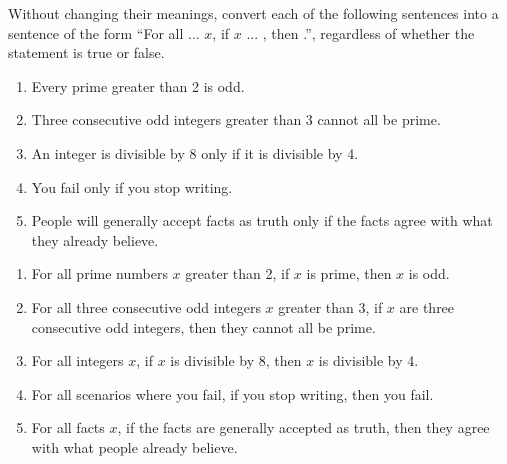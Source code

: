 \documentclass{article}
\theoremstyle{definition}
\begin{document}
\begin{question}
   Without changing their meanings, convert each of the following sentences into a sentence of the form ``For all ... $x$, if $x$ ... , then .'', regardless of whether the statement is true or false.
    \begin{enumerate}
        \item Every prime greater than 2 is odd.
        \item Three consecutive odd integers greater than 3 cannot all be prime.
        \item An integer is divisible by 8 only if it is divisible by 4.
        \item You fail only if you stop writing.
        \item People will generally accept facts as truth only if the facts agree with what they already believe.
    \end{enumerate}
\end{question}
\begin{solution}
    \begin{enumerate}
        \item For all prime numbers $x$ greater than 2, if $x$ is prime, then $x$ is odd.
        \item For all three consecutive odd integers $x$ greater than 3, if $x$ are three consecutive odd integers, then they cannot all be prime.
        \item For all integers $x$, if $x$ is divisible by 8, then $x$ is divisible by 4.
        \item For all scenarios where you fail, if you stop writing, then you fail.
        \item For all facts $x$, if the facts are generally accepted as truth, then they agree with what people already believe.
    \end{enumerate}
\end{solution}
\end{document}
